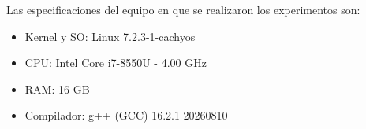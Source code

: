 
Las especificaciones del equipo en que se realizaron los experimentos son:

\begin{itemize}
	\item Kernel y SO: Linux 7.2.3-1-cachyos
	\item CPU: Intel Core i7-8550U - 4.00 GHz
	\item RAM: 16 GB
	\item Compilador: g++ (GCC) 16.2.1 20260810
\end{itemize}

